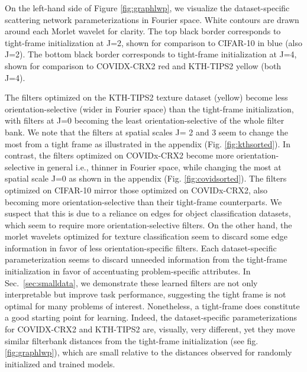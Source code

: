 \documentclass[10pt,twocolumn,letterpaper]{article}
\begin{document}
On the left-hand side of Figure \ref{fig:graphlwp}, we visualize the dataset-specific scattering network parameterizations in Fourier space. White contours are drawn around each Morlet wavelet for clarity. The top black border corresponds to tight-frame initialization at J=2, shown for comparison to CIFAR-10 in blue (also J=2). The bottom black border corresponds to tight-frame initialization at J=4, shown for comparison to COVIDX-CRX2 red and KTH-TIPS2 yellow (both J=4). 


The filters optimized on the KTH-TIPS2 texture dataset (yellow) become less orientation-selective (wider in Fourier space) than the tight-frame initialization, with filters at J=0 becoming the least orientation-selective of the whole filter bank. We note that the filters at spatial scales J= 2 and 3 seem to change the most from a tight frame as illustrated in the appendix (Fig. \ref{fig:kthsorted}). In contrast, the filters optimized on COVIDx-CRX2 become more orientation-selective in general i.e., thinner in Fourier space, while changing the most at spatial scale J=0 as shown in the appendix (Fig. \ref{fig:covidsorted}). The filters optimized on CIFAR-10 mirror those optimized on COVIDx-CRX2, also becoming more orientation-selective than their tight-frame counterparts. We suspect that this is due to a reliance on edges for object classification datasets, which seem to require more orientation-selective filters. On the other hand, the morlet wavelets optimized for texture classification seem to discard some edge information in favor of less orientation-specific filters. Each dataset-specific parameterization seems to discard unneeded information from the tight-frame initialization in favor of accentuating problem-specific attributes. In Sec.~\ref{sec:smalldata}, we demonstrate these learned filters are not only interpretable but improve task performance, suggesting the tight frame is not optimal for many problems of interest. Nonetheless, a tight-frame does constitute a good starting point for learning. Indeed, the dataset-specific parameterizations for COVIDX-CRX2 and KTH-TIPS2 are, visually, very different, yet they move similar filterbank distances from the tight-frame initialization (see fig.\ref{fig:graphlwp}), which are small relative to the distances observed for randomly initialized and trained models. 
\end{document}

